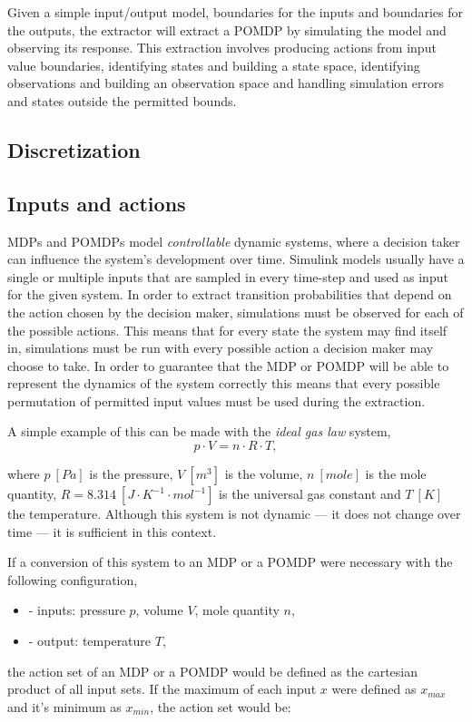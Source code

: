 Given a simple input/output model, boundaries for the inputs and boundaries for the outputs, the extractor will extract a POMDP by simulating the model and observing its response. This extraction involves producing actions from input value boundaries, identifying states and building a state space, identifying observations and building an observation space and handling simulation errors and states outside the permitted bounds.

\subsection{Discretization}
\label{subsec:discretization}





\subsection{Inputs and actions}
\label{subsec:inputsactions}

MDPs and POMDPs model \textit{controllable} dynamic systems, where a decision taker can influence the system's development over time. Simulink models usually have a single or multiple inputs that are sampled in every time-step and used as input for the given system. In order to extract transition probabilities that depend on the action chosen by the decision maker, simulations must be observed for each of the possible actions. This means that for every state the system may find itself in, simulations must be run with every possible action a decision maker may choose to take. In order to guarantee that the MDP or POMDP will be able to represent the dynamics of the system correctly this means that every possible permutation of permitted input values must be used during the extraction.

A simple example of this can be made with the \textit{ideal gas law} system,
\[
p\cdot V = n \cdot R \cdot T,
\]

where $p\ [Pa]$ is the pressure, $V\ [m^3]$ is the volume, $n\ [mole]$ is the mole quantity, $ R = 8.314\ [J\cdot K^{-1} \cdot mol^{-1}]$ is the universal gas constant and $T\ [K]$ the temperature. Although this system is not dynamic --- it does not change over time --- it is sufficient in this context.

If a conversion of this system to an MDP or a POMDP were necessary with the following configuration,

\begin{itemize}
\item - inputs: pressure $p$, volume $V$, mole quantity $n$,
\item - output: temperature $T$,
\end{itemize}
the action set of an MDP or a POMDP would be defined as the cartesian product of all input sets. If the maximum of each input $x$ were defined as $x_{max}$ and it's minimum as $x_{min}$, the action set would be:

